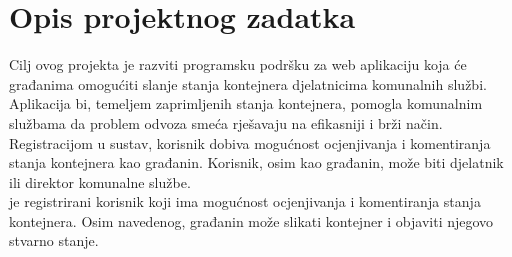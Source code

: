 \chapter{Opis projektnog zadatka}

		Cilj ovog projekta je razviti programsku podršku za web aplikaciju koja će građanima omogućiti slanje stanja kontejnera djelatnicima komunalnih službi. Aplikacija bi, temeljem zaprimljenih stanja kontejnera, pomogla komunalnim službama da problem odvoza smeća rješavaju na efikasniji i brži način.\\
		
		Registracijom u sustav, korisnik dobiva mogućnost ocjenjivanja i komentiranja stanja kontejnera kao građanin. Korisnik, osim kao građanin, može biti djelatnik ili direktor komunalne službe.\\
		
		 je registrirani korisnik koji ima mogućnost ocjenjivanja i komentiranja stanja kontejnera. Osim navedenog, građanin može slikati kontejner i objaviti njegovo stvarno stanje.\\
		
		
		\eject
		
		
		
	